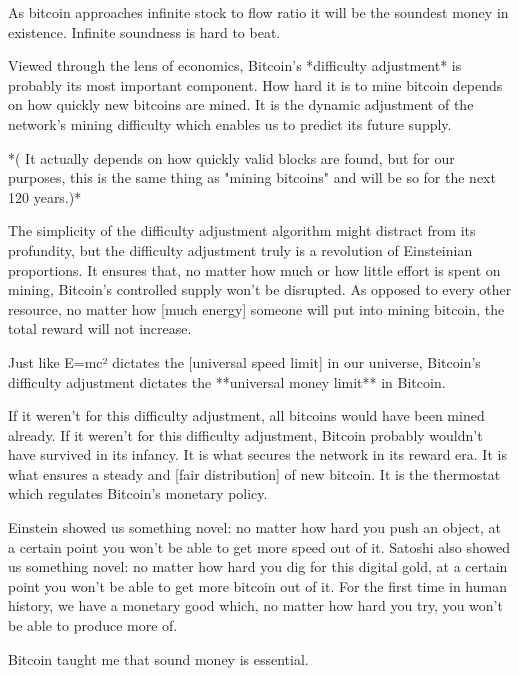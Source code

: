 As bitcoin approaches infinite stock to flow ratio it will be the
soundest money in existence. Infinite soundness is hard to beat.

Viewed through the lens of economics, Bitcoin's *difficulty adjustment*
is probably its most important component. How hard it is to mine bitcoin
depends on how quickly new bitcoins are mined\*. It is the dynamic
adjustment of the network's mining difficulty which enables us to
predict its future supply.

*(\* It actually depends on how quickly valid blocks are found, but for
our purposes, this is the same thing as "mining bitcoins" and will be so
for the next 120 years.)*

The simplicity of the difficulty adjustment algorithm might distract
from its profundity, but the difficulty adjustment truly is a revolution
of Einsteinian proportions. It ensures that, no matter how much or how
little effort is spent on mining, Bitcoin's controlled supply won't be
disrupted. As opposed to every other resource, no matter how [much
energy] someone will put into mining bitcoin, the total reward will not
increase.

Just like E=mc² dictates the [universal speed limit] in our universe,
Bitcoin's difficulty adjustment dictates the **universal money limit**
in Bitcoin.

If it weren't for this difficulty adjustment, all bitcoins would have
been mined already. If it weren't for this difficulty adjustment,
Bitcoin probably wouldn't have survived in its infancy. It is what
secures the network in its reward era. It is what ensures a steady and
[fair distribution] of new bitcoin. It is the thermostat which regulates
Bitcoin's monetary policy.

Einstein showed us something novel: no matter how hard you push an
object, at a certain point you won't be able to get more speed out of
it. Satoshi also showed us something novel: no matter how hard you dig
for this digital gold, at a certain point you won't be able to get more
bitcoin out of it. For the first time in human history, we have a
monetary good which, no matter how hard you try, you won't be able to
produce more of.

Bitcoin taught me that sound money is essential.


